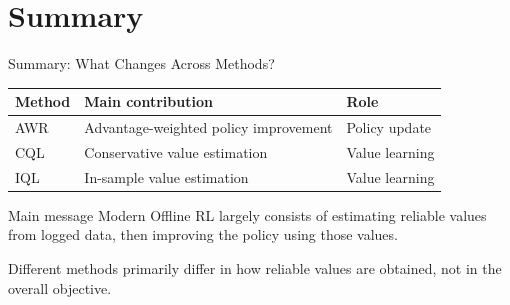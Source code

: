 \section{Summary}

\begin{frame}{Summary: What Changes Across Methods?}
  \centering
  \renewcommand{\arraystretch}{1.35}
  \begin{tabular}{@{}p{}p{}p{}@{}}
    \toprule
    \textbf{Method} & \textbf{Main contribution} & \textbf{Role} \\
    \midrule
    AWR
    & Advantage-weighted policy improvement
    & Policy update \\
    \addlinespace
    CQL
    & Conservative value estimation
    & Value learning \\
    \addlinespace
    IQL
    & In-sample value estimation
    & Value learning \\
    \bottomrule
  \end{tabular}

  \vspace{0.55cm}
  \begin{block}{Main message}
    Modern Offline RL largely consists of estimating reliable values from logged data, then improving the policy using those values.
  \end{block}
  \vspace{0.1cm}
  Different methods primarily differ in how reliable values are obtained, not in the overall objective.
\end{frame}
